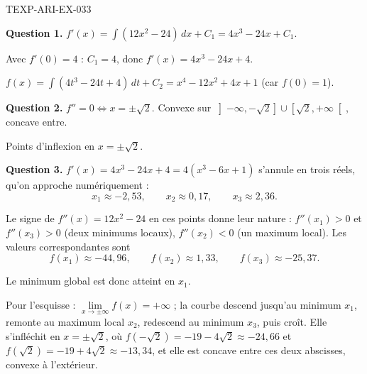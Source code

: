 \begin{corrige}{TEXP-ARI-EX-033}

\textbf{Question 1.} $f'(x) = \int (12x^2 - 24)\,dx + C_1 = 4x^3 - 24x + C_1$.

Avec $f'(0) = 4$ : $C_1 = 4$, donc $f'(x) = 4x^3 - 24x + 4$.


$f(x) = \int (4t^3 - 24t + 4)\,dt + C_2 = x^4 - 12x^2 + 4x + 1$ (car $f(0) = 1$).

\textbf{Question 2.} $f'' = 0 \iff x = \pm\sqrt{2}$. Convexe sur $\left]-\infty,-\sqrt2\right] \cup \left[\sqrt2,+\infty\right[$, concave entre.

Points d'inflexion en $x = \pm\sqrt{2}$.

\textbf{Question 3.} $f'(x) = 4x^3 - 24x + 4 = 4(x^3 - 6x + 1)$ s'annule en trois
réels, qu'on approche numériquement :
\[ x_1 \approx -2{,}53, \qquad x_2 \approx 0{,}17, \qquad x_3 \approx 2{,}36. \]

Le signe de $f''(x) = 12x^2 - 24$ en ces points donne leur nature :
$f''(x_1) > 0$ et $f''(x_3) > 0$ (deux minimums locaux), $f''(x_2) < 0$ (un
maximum local). Les valeurs correspondantes sont
\[ f(x_1) \approx -44{,}96, \qquad f(x_2) \approx 1{,}33, \qquad f(x_3) \approx -25{,}37. \]

Le minimum global est donc atteint en $x_1$.

Pour l'esquisse : $\lim\limits_{x\to\pm\infty} f(x) = +\infty$ ; la courbe descend
jusqu'au minimum $x_1$, remonte au maximum local $x_2$, redescend au minimum
$x_3$, puis croît. Elle s'infléchit en $x=\pm\sqrt2$, où
$f(-\sqrt2) = -19-4\sqrt2 \approx -24{,}66$ et $f(\sqrt2) = -19+4\sqrt2 \approx -13{,}34$,
et elle est concave entre ces deux abscisses, convexe à l'extérieur.

\end{corrige}

